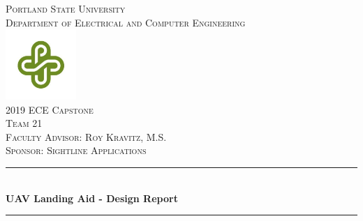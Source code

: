 \documentclass[11pt]{article}
\begin{document}

\begin{titlepage} %
	\newcommand{\HRule}{\rule{\linewidth}{0.5mm}} %
	
	\center %
	
	
	\textsc{\LARGE Portland State University
}\\[.25cm] %
	
	\textsc{\Large Department of Electrical and Computer Engineering }\\[1cm] %
\includegraphics[width=0.2\textwidth]{psuLOGO.jpg}\\[1cm]	
	\textsc{\LARGE2019  ECE Capstone }\\[0.12cm] %
	\textsc{\LARGE Team 21 }\\[0.12cm]	
		\textsc{\Large Faculty Advisor: Roy Kravitz, M.S. }\\[0.12cm]
		\textsc{\Large Sponsor: Sightline Applications }\\[1cm]
	
	
	\HRule\\[0.4cm]
	
	{\huge\bfseries UAV Landing Aid - Design Report}\\[0.4cm] %
	
	\HRule\\[1.5cm]
	
	

\end{titlepage}
\end{document}
